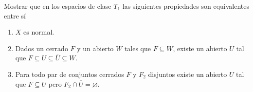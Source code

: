 \documentclass{article}
\theoremstyle{definition}
\newenvironment{ejercicio}[1]{\begin{trivlist}
\item[\hskip \labelsep {\bfseries Ejercicio}\hskip \labelsep {\bfseries #1.}]}{\end{trivlist}}
\begin{document}
\clearpage

\begin{ejercicio}{5}
    Mostrar que en los espacios de clase \(T_{1}\) las siguientes propiedades son equivalentes entre sí
    \begin{enumerate}
        \item \(X\) es normal.
        \item Dados un cerrado \(F\) y un abierto \(W\) tales que \(F \subseteq W\), existe un abierto \(U\) tal que \(F \subseteq U \subseteq \overline{U} \subseteq W\).
        \item Para todo par de conjuntos cerrados \(F\) y \(F_2\) disjuntos existe un abierto \(U\) tal que \(F \subseteq U\) pero \(F_2 \cap \overline{U} = \varnothing \).
    \end{enumerate}
\end{ejercicio}
\end{document}
